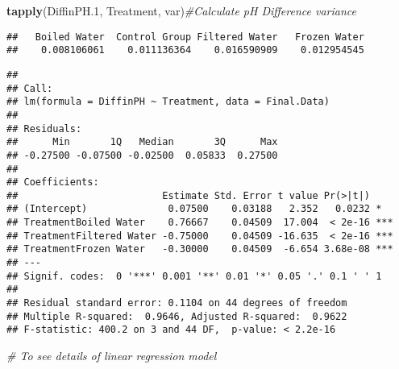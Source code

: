 \documentclass[12pt,]{article}
\newenvironment{Shaded}{\begin{snugshade}}{\end{snugshade}}
\newcommand{\CommentTok}[1]{\textcolor[rgb]{0.56,0.35,0.01}{\textit{#1}}}
\newcommand{\DataTypeTok}[1]{\textcolor[rgb]{0.13,0.29,0.53}{#1}}
\newcommand{\FloatTok}[1]{\textcolor[rgb]{0.00,0.00,0.81}{#1}}
\newcommand{\KeywordTok}[1]{\textcolor[rgb]{0.13,0.29,0.53}{\textbf{#1}}}
\newcommand{\NormalTok}[1]{#1}
\newcommand{\OperatorTok}[1]{\textcolor[rgb]{0.81,0.36,0.00}{\textbf{#1}}}
\newcommand{\StringTok}[1]{\textcolor[rgb]{0.31,0.60,0.02}{#1}}
\begin{document}
\begin{Shaded}
\begin{Highlighting}[]
\KeywordTok{tapply}\NormalTok{(DiffinPH}\FloatTok{.1}\NormalTok{, Treatment, var)}\CommentTok{#Calculate pH Difference variance}
\end{Highlighting}
\end{Shaded}

\begin{verbatim}
##   Boiled Water  Control Group Filtered Water   Frozen Water 
##    0.008106061    0.011136364    0.016590909    0.012954545
\end{verbatim}

\begin{Shaded}
\end{Shaded}

\begin{verbatim}
## 
## Call:
## lm(formula = DiffinPH ~ Treatment, data = Final.Data)
## 
## Residuals:
##      Min       1Q   Median       3Q      Max 
## -0.27500 -0.07500 -0.02500  0.05833  0.27500 
## 
## Coefficients:
##                         Estimate Std. Error t value Pr(>|t|)    
## (Intercept)              0.07500    0.03188   2.352   0.0232 *  
## TreatmentBoiled Water    0.76667    0.04509  17.004  < 2e-16 ***
## TreatmentFiltered Water -0.75000    0.04509 -16.635  < 2e-16 ***
## TreatmentFrozen Water   -0.30000    0.04509  -6.654 3.68e-08 ***
## ---
## Signif. codes:  0 '***' 0.001 '**' 0.01 '*' 0.05 '.' 0.1 ' ' 1
## 
## Residual standard error: 0.1104 on 44 degrees of freedom
## Multiple R-squared:  0.9646, Adjusted R-squared:  0.9622 
## F-statistic: 400.2 on 3 and 44 DF,  p-value: < 2.2e-16
\end{verbatim}

\begin{Shaded}
\begin{Highlighting}[]
\CommentTok{# To see details of linear regression model}
\end{Highlighting}
\end{Shaded}
\end{document}
